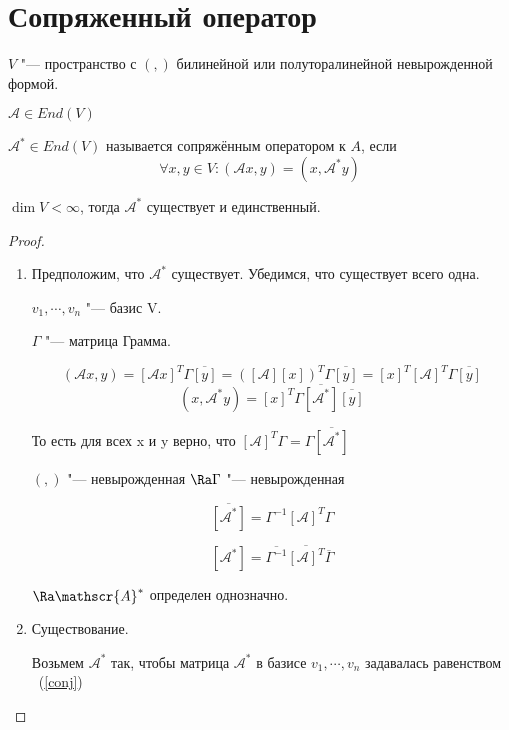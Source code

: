 \section{Сопряженный оператор}
\begin{Def}
$V$ "--- пространство с $(, )$ билинейной или полуторалинейной невырожденной формой. 

$\mathscr{A} \in End(V)$

$\mathscr{A}^* \in End(V)$ называется сопряжённым оператором к $A$, если 
$$\forall x, y \in V \colon (\mathscr{A}x, y) = (x, \mathscr{A}^*y)$$
\end{Def}

\begin{theorem}{}
$\dim V < \infty$, тогда $\mathscr{A}^*$ существует и единственный. 
\end{theorem}
\begin{proof}
    \begin{enumerate}
    \item Предположим, что $\mathscr{A}^{*}$ существует. Убедимся, что существует всего одна. 
    
    $v_1, \cdots, v_n$ "--- базис V.
    
    $\Gamma$  "--- матрица Грамма.

    $$(\mathscr{A}x, y) = [\mathscr{A}x]^{T}\Gamma \overline{[y]} = ([\mathscr{A}][x])^{T}\Gamma \overline{[y]} = 
    [x]^{T}[\mathscr{A}]^{T}\Gamma \overline{[y]}$$ 
    $$(x, \mathscr{A}^{*}y) = [x]^{T}\Gamma \overline{[\mathscr{A}^*]}\overline{[y]}$$ 

    То есть для всех x и y верно, что $[\mathscr{A}]^{T} \Gamma = \Gamma \overline{[\mathscr{A}^*]}$

    $(,)$ "--- невырожденная $\Ra \Gamma$ "--- невырожденная

    $$\overline{[\mathscr{A}^*]} = \Gamma^{-1}[\mathscr{A}]^{T}\Gamma$$
    
    \begin{equation}
    \label{conj}
    [\mathscr{A}^{*}] = \overline{\Gamma^{-1}}\overline{[\mathscr{A}]^{T}}\overline{\Gamma}   
    \end{equation}
   
    $\Ra \mathscr{A}^{*}$ определен однозначно.

    \item Существование.

    Возьмем $\mathscr{A}^{*}$ так, чтобы матрица $\mathscr{A}^*$ в базисе $v_1,\cdots, v_n$ задавалась равенством ~(\ref{conj})


\end{enumerate}
\end{proof}
